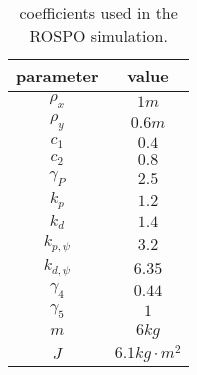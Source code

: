 \begin{table}[bt]
    \centering
    \caption{coefficients used in the ROSPO simulation.}
    \label{tab:simdata}
    \begin{tabular}{c c}
        parameter & value \\ \hline \hline
        $\rho_{x}$ & $1m$ \\
        $\rho_{y}$ & $0.6m$ \\
        $c_{1}$ & $0.4$ \\
        $c_{2}$ & $0.8$ \\
        $\gamma_{P}$ & $2.5$ \\
        $k_{p}$ & $1.2$ \\
        $k_{d}$ & $1.4$ \\
        $k_{p, \psi}$ & $3.2$ \\
        $k_{d, \psi}$ & $6.35$ \\
        $\gamma_{4}$ & $0.44$ \\
        $\gamma_{5}$ & $1$ \\
        $m$ & $6kg$ \\
        $J$ & $6.1kg\cdot m^{2}$
    \end{tabular}
\end{table}

